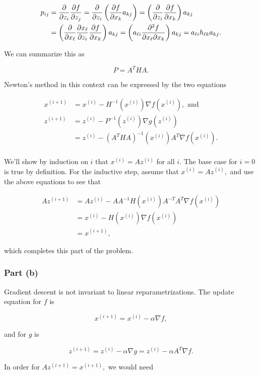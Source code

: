 \documentclass[]{article}
\begin{document}
\[
\begin{aligned}
p_{ij} & = \frac{\partial}{\partial z_i}\frac{\partial f}{\partial z_j} = \frac{\partial}{\partial z_i}\left(\frac{\partial f}{\partial x_k}a_{kj}\right)
= \left(\frac{\partial}{\partial z_i}\frac{\partial f}{\partial x_k}\right)a_{kj} \\
& = \left(\frac{\partial}{\partial x_\ell}\frac{\partial x_\ell}{\partial z_i}\frac{\partial f}{\partial x_k}\right)a_{kj}
= \left(a_{\ell i}\frac{\partial^2f}{\partial x_\ell\partial x_k}\right)a_{kj}
= a_{\ell i}h_{\ell k}a_{kj}.
\end{aligned}
\]

We can summarize this as

\[P = A^T H A.\]

Newton's method in this context can be expressed by the two equations

\[\begin{aligned}
x^{(i+1)} & = x^{(i)} - H^{-1}(x^{(i)}) \nabla f(x^{(i)}), \text{ and} \\
z^{(i+1)} & = z^{(i)} - P^{-1}(z^{(i)}) \nabla g(z^{(i)}) \\
          & = z^{(i)} - (A^THA)^{-1}(x^{(i)}) A^T\nabla f(x^{(i)}). \\
\end{aligned}\]

We'll show by induction on \(i\) that \(x^{(i)} = Az^{(i)}\) for all
\(i.\) The base case for \(i=0\) is true by definition. For the
inductive step, assume that \(x^{(i)} = Az^{(i)},\) and use the above
equations to see that

\[\begin{aligned}
Az^{(i+1)} & = Az^{(i)} - AA^{-1}H(x^{(i)})A^{-T}A^T\nabla f(x^{(i)}) \\
           & = x^{(i)} - H(x^{(i)}) \nabla f(x^{(i)}) \\
           & = x^{(i+1)},
\end{aligned}\]

which completes this part of the problem.

\subsubsection{Part (b)}\label{part-b-2}

Gradient descent is not invariant to linear reparametrizations. The
update equation for \(f\) is

\[x^{(i+1)} = x^{(i)} - \alpha\nabla f,\]

and for \(g\) is

\[z^{(i+1)} = z^{(i)} - \alpha\nabla g = z^{(i)} - \alpha A^T\nabla f.\]

In order for \(Az^{(i+1)} = x^{(i+1)},\) we would need
\end{document}
